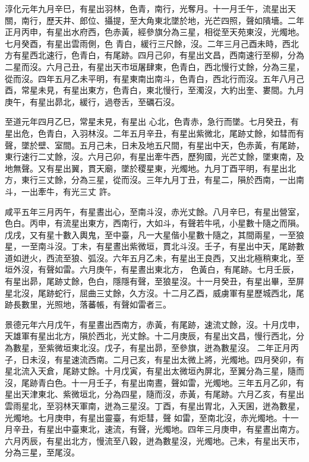 \begin{pinyinscope}
 淳化元年九月辛巳，有星出羽林，色青，南行，光奪月。十一月壬午，流星出天關，南行，歷天井、郎位、攝提，至大角東北墜於地，光芒四照，聲如隤墻。二年正月丙申，有星出水府西，色赤黃，經參旗分為三星，相從至天苑東沒，光燭地。七月癸酉，有星出雲雨側，色
 青白，緩行三尺餘，沒。二年三月己酉未時，西北方有星西北速行，色青白，有尾跡。四月己卯，有星出文昌，西南速行至柳，分為二星而沒。六月己丑，有星出天市垣屠肆東，色青白，西北慢行丈餘，分為三星，從而沒。四年五月乙未平明，有星東南出南斗，色青白，西北行而沒。五年八月己酉，常星未見，有星出東方，色青白，東北慢行，至濁沒，大約出奎、婁間。九月庚午，有星出昴北，緩行，過卷舌，至礪石沒。



 至道元年四月乙巳，常星未見，有星出
 心北，色青赤，急行而墜。七月癸丑，有星出危，色青白，入羽林沒。二年五月辛丑，有星出紫微北，尾跡丈餘，如彗而有聲，墜於壁、室間。五月己未，日未及地五尺間，有星出中天，色赤黃，有尾跡，東行速行二丈餘，沒。六月己卯，有星出牽牛西，歷狗國，光芒丈餘，墜東南，及地無聲。又有星出翼，貫天廟，墜於稷星東，光燭地。九月丁酉平明，有星出北方，東行三丈餘，分為三星，從而沒。三年九月丁丑，有星二，隕於西南，一出南斗，一出牽牛，有光三丈
 許。



 咸平五年三月丙午，有星晝出心，至南斗沒，赤光丈餘。八月辛巳，有星出營室，色白。丙申，有流星出東方，西南行，大如斗，有聲若牛吼，小星數十隨之而隕。戊戌，又有星十數入輿鬼，至中臺，凡一大星偕小星數十隨之，其間兩星，一至狼星，一至南斗沒。丁未，有星晝出紫微垣，貫北斗沒。壬子，有星出中天，尾跡數道如迸火，西流至狼、弧沒。六年五月乙未，有星出王良西，又出北極稍東北，至垣外沒，有聲如雷。六月庚午，有星晝出東北方，
 色黃白，有尾跡。七月壬辰，有星出昴，尾跡丈餘，色白，隱隱有聲，至狼星沒。十一月癸丑，有星出畢，至屏星北沒，尾跡蛇行，屈曲三丈餘，久方沒。十二月乙酉，威虜軍有星歷城西北，尾跡長數里，光照地，落蕃帳，有聲如雷者三。



 景德元年六月戊午，有星晝出西南方，赤黃，有尾跡，速流丈餘，沒。十月戊申，天雄軍有星出北方，隕於西北，光丈餘。十二月庚辰，有星出文昌，慢行西北，分為數星，至紫微垣東北沒。戊子，有星出昴，至參旗，迸為數星沒。
 二年正月丙子，日未沒，有星速流西南。二月己亥，有星出太微上將，光燭地。四月癸卯，有星北流入天倉，尾跡丈餘。十月戊寅，有星出太微垣內屏北，至翼分為三星，隨而沒，尾跡青白色。十一月壬子，有星出南晝，聲如雷，光燭地。三年五月乙卯，有星出天津東北、紫微垣北，分為四星，隨而沒，赤黃，有尾跡。六月乙亥，有星出雲雨星北，至羽林天軍南，迸為三星沒。丁酉，有星出胃北，入天囷，迸為數星，光燭地。七月庚申，有星出靈臺，有炬彗，聲
 如雷，至南北沒，赤光燭地。十一月辛丑，有星出中臺東北，速流，有聲，光燭地。四年三月庚申，有星晝出南方。六月丙辰，有星出北方，慢流至八穀，迸為數星沒，光燭地。己未，有星出天市，分為三星，至尾沒。




\end{pinyinscope}
